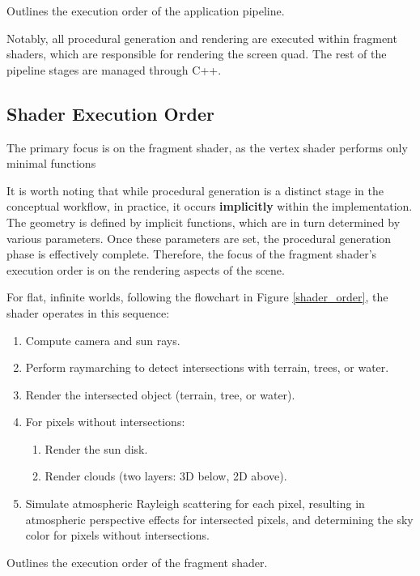{Outlines the execution order of the application pipeline.}

Notably, all procedural generation and rendering are executed within fragment shaders, which are responsible for rendering the screen quad. The rest of the pipeline stages are managed through C++.

\subsection{Shader Execution Order}

The primary focus is on the fragment shader, as the vertex shader performs only minimal functions

It is worth noting that while procedural generation is a distinct stage in the conceptual workflow, in practice, it occurs \textbf{implicitly} within the implementation. The geometry is defined by implicit functions, which are in turn determined by various parameters. Once these parameters are set, the procedural generation phase is effectively complete. Therefore, the focus of the fragment shader’s execution order is on the rendering aspects of the scene.

For flat, infinite worlds, following the flowchart in Figure \ref{shader_order}, the shader operates in this sequence:
\begin{enumerate}
    \item Compute camera and sun rays.
    \item Perform raymarching to detect intersections with terrain, trees, or water.
    \item Render the intersected object (terrain, tree, or water).
    \item For pixels without intersections:
        \begin{enumerate}
            \item Render the sun disk.
            \item Render clouds (two layers: 3D below, 2D above).
        \end{enumerate}
    \item Simulate atmospheric Rayleigh scattering for each pixel, resulting in atmospheric perspective effects for intersected pixels, and determining the sky color for pixels without intersections.
\end{enumerate}

{Outlines the execution order of the fragment shader.}


